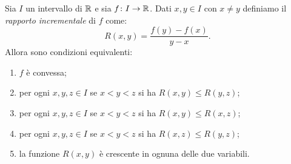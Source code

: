 \begin{lemma}
\mymark{*}
Sia $I$ un intervallo di $\mathbb R$ e sia $f\colon I\to \mathbb R$.
Dati $x,y\in I$ con $x\neq y$ definiamo il \emph{rapporto incrementale}
di $f$ come:
\[
  R(x,y) = \frac{f(y) - f(x)}{y-x}.
\]
Allora sono condizioni equivalenti:
\begin{enumerate}
\item $f$ è convessa;
\item per ogni $x,y,z\in I$ se $x<y<z$ si ha $R(x,y)\le R(y,z)$;
\item per ogni $x,y,z\in I$ se $x<y<z$ si ha $R(x,y)\le R(x,z)$;
\item per ogni $x,y,z\in I$ se $x<y<z$ si ha $R(x,z)\le R(y,z)$;
\item la funzione $R(x,y)$ è crescente in ognuna delle due variabili.
\end{enumerate}
\end{lemma}
%
